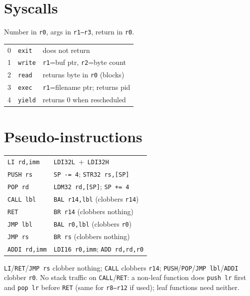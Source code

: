 \documentclass[9pt]{extarticle}
\newcommand{\code}[1]{\texttt{#1}}
\begin{document}
\begin{multicols}{2}
\section{Syscalls}
Number in \code{r0}, args in \code{r1--r3}, return in \code{r0}.

\begin{tabular}{@{}C{0.55cm} L{1.3cm} L{4.6cm}@{}}
0 & \code{exit}  & does not return \\
1 & \code{write} & \code{r1}=buf ptr, \code{r2}=byte count \\
2 & \code{read}  & returns byte in \code{r0} (blocks) \\
3 & \code{exec}  & \code{r1}=filename ptr; returns pid \\
4 & \code{yield} & returns 0 when rescheduled \\
\end{tabular}

\section{Pseudo-instructions}
\begin{tabular}{@{}L{1.9cm} L{4.7cm}@{}}
\code{LI rd,imm}   & \code{LDI32L}~+~\code{LDI32H} \\
\code{PUSH rs}     & \code{SP\,-=\,4};\; \code{STR32 rs,[SP]} \\
\code{POP rd}      & \code{LDM32 rd,[SP]};\; \code{SP\,+=\,4} \\
\code{CALL lbl}    & \code{BAL r14,lbl} \quad(clobbers \code{r14}) \\
\code{RET}         & \code{BR r14} \quad(clobbers nothing) \\
\code{JMP lbl}     & \code{BAL r0,lbl} \quad(clobbers \code{r0}) \\
\code{JMP rs}      & \code{BR rs} \quad(clobbers nothing) \\
\code{ADDI rd,imm} & \code{LDI16 r0,imm};\; \code{ADD rd,rd,r0} \\
\end{tabular}
\par\vspace{0.2em}\noindent
{\footnotesize \code{LI}/\code{RET}/\code{JMP rs} clobber nothing; \code{CALL}
clobbers \code{r14}; \code{PUSH}/\code{POP}/\code{JMP lbl}/\code{ADDI} clobber
\code{r0}. No stack traffic on \code{CALL}/\code{RET}: a non-leaf function does
\code{push lr} first and \code{pop lr} before \code{RET} (same for \code{r8--r12}
if used); leaf functions need neither.}


\end{multicols}
\end{document}
